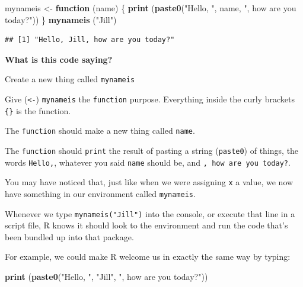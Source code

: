 \documentclass[
]{book}
\newenvironment{Shaded}{\begin{snugshade}}{\end{snugshade}}
\newcommand{\ControlFlowTok}[1]{\textcolor[rgb]{0.13,0.29,0.53}{\textbf{#1}}}
\newcommand{\KeywordTok}[1]{\textcolor[rgb]{0.13,0.29,0.53}{\textbf{#1}}}
\newcommand{\NormalTok}[1]{#1}
\newcommand{\StringTok}[1]{\textcolor[rgb]{0.31,0.60,0.02}{#1}}
\begin{document}
\begin{Shaded}
\begin{Highlighting}[]
\NormalTok{mynameis <-}\StringTok{ }\ControlFlowTok{function}\NormalTok{ (name) \{}
  \KeywordTok{print}\NormalTok{ (}\KeywordTok{paste0}\NormalTok{(}\StringTok{"Hello, "}\NormalTok{, name, }\StringTok{", how are you today?"}\NormalTok{))}
\NormalTok{\}}
\KeywordTok{mynameis}\NormalTok{ (}\StringTok{"Jill"}\NormalTok{)}
\end{Highlighting}
\end{Shaded}

\begin{verbatim}
## [1] "Hello, Jill, how are you today?"
\end{verbatim}

\textbf{What is this code saying?}

\begin{translate}
Create a new thing called \texttt{mynameis}

Give (\texttt{\textless{}-}) \texttt{mynameis} the \texttt{function}
purpose. Everything inside the curly brackets \texttt{\{\}} is the
function.

The \texttt{function} should make a new thing called \texttt{name}.

The \texttt{function} should \texttt{print} the result of pasting a
string (\texttt{paste0}) of things, the words \texttt{Hello,}, whatever
you said \texttt{name} should be, and \texttt{,\ how\ are\ you\ today?}.
\end{translate}

You may have noticed that, just like when we were assigning \texttt{x} a value, we now have something in our environment called \texttt{mynameis}.

Whenever we type \texttt{mynameis("Jill")} into the console, or execute that line in a script file, R knows it should look to the environment and run the code that's been bundled up into that package.

For example, we could make R welcome us in exactly the same way by typing:

\begin{Shaded}
\begin{Highlighting}[]
\KeywordTok{print}\NormalTok{ (}\KeywordTok{paste0}\NormalTok{(}\StringTok{"Hello, "}\NormalTok{, }\StringTok{"Jill"}\NormalTok{, }\StringTok{", how are you today?"}\NormalTok{))}
\end{Highlighting}
\end{Shaded}
\end{document}
